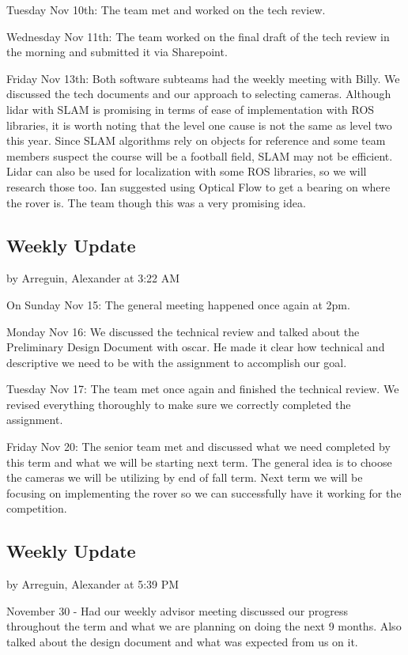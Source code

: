 \documentclass[10pt, oneside,onecolumn]{IEEEtran}
\begin{document}
Tuesday Nov 10th: The team met and worked on the tech review.

Wednesday Nov 11th: The team worked on the final draft of the tech review in the morning and submitted it via Sharepoint.

Friday Nov 13th: Both software subteams had the weekly meeting with Billy. We discussed the tech documents and our approach to selecting cameras. Although lidar with SLAM is promising in terms of ease of implementation with ROS libraries, it is worth noting that the level one cause is not the same as level two this year. Since SLAM algorithms rely on objects for reference and some team members suspect the course will be a football field, SLAM may not be efficient. Lidar can also be used for localization with some ROS libraries, so we will research those too. Ian suggested using Optical Flow to get a bearing on where the rover is. The team though this was a very promising idea. 

\subsection{Weekly Update}
by Arreguin, Alexander at 3:22 AM

On Sunday Nov 15: The general meeting happened once again at 2pm. 

Monday Nov  16:  We discussed the technical review and talked about the Preliminary Design Document with oscar. He made it clear how technical and descriptive we need to be with the assignment to accomplish our goal.

Tuesday Nov 17: The team met once again and finished the technical review. We revised everything thoroughly to make sure we correctly completed the assignment. 

Friday Nov 20: The senior team met and discussed what we need completed by this term and what we will be starting next term. The general idea is to choose the cameras we will be utilizing by end of fall term. Next term we will be focusing on implementing the rover so we can successfully have it working for the competition.

\subsection{Weekly Update}
by Arreguin, Alexander at 5:39 PM

November 30 - Had our weekly advisor meeting discussed our progress throughout the term and what we are planning on doing the next 9 months. Also talked about the design document and what was expected from us on it. 
\end{document}
